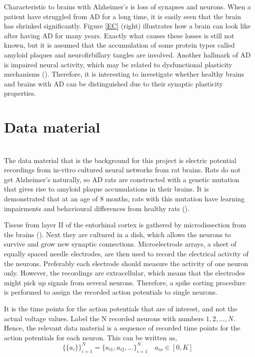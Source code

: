 Characteristic to brains with Alzheimer's is loss of synapses and neurons. When a patient have struggled from AD for a long time, it is easily seen that the brain has shrinked significantly. Figure \ref{EC} (right) illustrates how a brain can look like after having AD for many years. Exactly what causes these losses is still not known, but it is assumed that the accumulation of some protein types called amyloid plaques and neurofirbillary tangles are involved. Another hallmark of AD is impaired neural activity, which may be related to dysfunctional plasticity mechanisms (\cite{Zott}). Therefore, it is interesting to investigate whether healthy brains and brains with AD can be distinguished due to their synaptic plasticity properties.


\section{Data material}

\label{Lab}\\
The data material that is the background for this project is electric potential recordings from in-vitro cultured neural networks from rat brains. Rats do not get Alzheimer's naturally, so AD rats are constructed with a genetic mutation that gives rise to amyloid plaque accumulations in their brains. It is demonstrated that at an age of 8 months, rats with this mutation have learning impairments and behavioural differences from healthy rats (\cite{Radde}). 

Tissue from layer II of the entorhinal cortex is gathered by microdissection from the brains (\cite{Katrine}). Next they are cultured in a dish, which allows the neurons to survive and grow new synaptic connections. Microelectrode arrays, a sheet of equally spaced needle electrodes, are then used to record the electrical activity of the neurons. Preferably each electrode should measure the activity of one neuron only. However, the recordings are extracellular, which means that the electrodes might pick up signals from several neurons. Therefore, a spike sorting procedure is performed to assign the recorded action potentials to single neurons. 

It is the time points for the action potentials that are of interest, and not the actual voltage values. Label the N recorded neurons with numbers $1,2,...,N$. Hence, the relevant data material is a sequence of recorded time points for the action potentials for each neuron. This can be written as, 
\begin{equation}
\label{eq:AP}
    \{\{a_i\}\}_{i=1}^{N} = \{a_{i1}, a_{i2}, ...\}_{i=1}^{N} \quad a_{ix} \in [0,K]
\end{equation}

